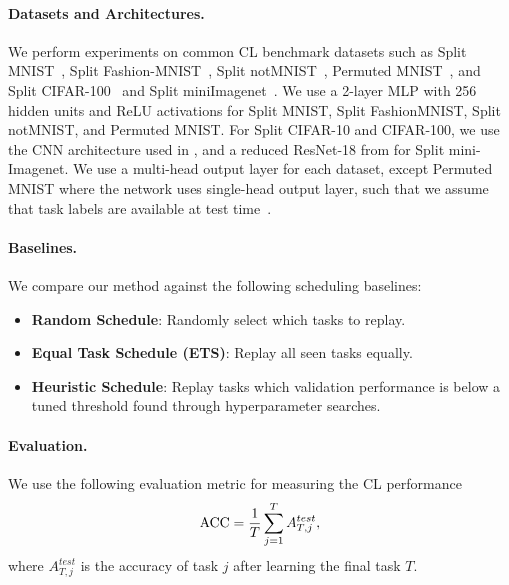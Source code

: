 \vspace{-3mm}
\paragraph{Datasets and Architectures.} We perform experiments on common CL benchmark datasets such as Split MNIST~\cite{zenke2017continual}, Split Fashion-MNIST~\cite{xiao2017fashion}, Split notMNIST~\cite{bulatov2011notMNIST}, Permuted MNIST~\cite{goodfellow2013empirical}, and Split CIFAR-100~\cite{krizhevsky2009learning, lopez2017gradient, rebuffi2017icarl} and Split miniImagenet~\cite{vinyals2016matching}. We use a 2-layer MLP with 256 hidden units and ReLU activations for Split MNIST, Split FashionMNIST, Split notMNIST, and Permuted MNIST.  For Split CIFAR-10 and CIFAR-100, we use the CNN architecture used in \cite{adel2019continual, schwarz2018progress, vinyals2016matching}, and a reduced ResNet-18 from \cite{lopez2017gradient} for Split mini-Imagenet. We use a multi-head output layer for each dataset, except Permuted MNIST where the network uses single-head output layer, such that we assume that task labels are available at test time~\cite{van2019three}. 

\vspace{-3mm}
\paragraph{Baselines.} We compare our method against the following scheduling baselines:
\begin{itemize}[itemsep=0em,topsep=1pt]
	\item {\bf Random Schedule}: Randomly select which tasks to replay.
	\item {\bf Equal Task Schedule (ETS)}: Replay all seen tasks equally.
	\item {\bf Heuristic Schedule}: Replay tasks which validation performance is below a tuned threshold found through hyperparameter searches.
\end{itemize} 

\vspace{-3mm}
\paragraph{Evaluation.} We use the following evaluation metric for measuring the CL performance
\begin{align}
	{\text{ACC}} = \frac{1}{T} \sum_{j=1}^{T} A_{T, j}^{test},
\end{align}
where $A_{T, j}^{test}$ is the accuracy of task $j$ after learning the final task $T$.  

